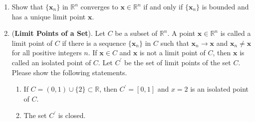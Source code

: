 \documentclass[11pt,letter,notitlepage]{article}
\theoremstyle{definition}
\begin{document}
\newpage
	    \begin{exercise}
\begin{enumerate}
    \item Show that $\{\mathbf{x}_n\}$ in $\mathbb{R}^n$ converges to $\mathbf{x}\in \mathbb{R}^n$ if and only if $\{\mathbf{x}_n\}$ is bounded and has a unique limit point $\mathbf{x}$.
    \item (\textbf{Limit Points of a Set}). Let $C$ be a subset of $\mathbb{R}^n$. A point $\mathbf{x}\in \mathbb{R}^n$ is called a limit point of $C$ if there is a sequence $\{\mathbf{x}_n\}$ in $C$ such that $\mathbf{x}_n\to \mathbf{x}$ and $\mathbf{x}_n \not=\mathbf{x}$ for all positive integers $n$. If $\mathbf{x}\in C$ and $\mathbf{x}$ is not a limit point of $C$, then $\mathbf{x}$ is called an isolated point of $C$. Let $C^\prime$ be the set of limit points of the set $C$. Please show the following statements.
    \begin{enumerate}
        \item If $C = (0,1)\cup\{2\}\subset \mathbb{R}$, then $C^\prime =[0,1]$ and $x=2$ is an isolated point of $C$.
        \item  The set $C^\prime$ is closed.
    \end{enumerate}
\end{enumerate}
\end{exercise}

\newpage
\end{document}
